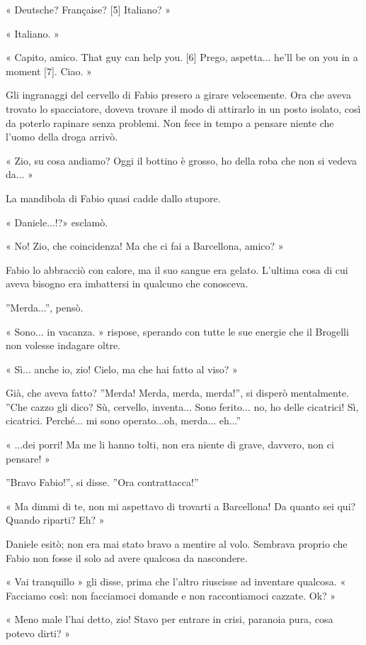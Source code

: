 « Deutsche? Française? [5] Italiano? »

« Italiano. »

« Capito, amico. That guy can help you. [6] Prego, aspetta... he'll be on you in a moment [7]. Ciao. »

Gli ingranaggi del cervello di Fabio presero a girare velocemente. Ora che aveva trovato lo spacciatore, doveva trovare il modo di attirarlo in un posto isolato, così da poterlo rapinare senza problemi. Non fece in tempo a pensare niente che l'uomo della droga arrivò.

« Zio, su cosa andiamo? Oggi il bottino è grosso, ho della roba che non si vedeva da... »

La mandibola di Fabio quasi cadde dallo stupore.

« Daniele...!?» esclamò.

« No! Zio, che coincidenza! Ma che ci fai a Barcellona, amico? »

Fabio lo abbracciò con calore, ma il suo sangue era gelato. L'ultima cosa di cui aveva bisogno era imbattersi in qualcuno che conosceva.

''Merda...'', pensò.

« Sono... in vacanza. » rispose, sperando con tutte le sue energie che il Brogelli non volesse indagare oltre.

« Sì... anche io, zio! Cielo, ma che hai fatto al viso? »

Già, che aveva fatto? ''Merda! Merda, merda, merda!'', si disperò mentalmente. ''Che cazzo gli dico? Sù, cervello, inventa... Sono ferito... no, ho delle cicatrici! Sì, cicatrici. Perché... mi sono operato...oh, merda... eh...''

« ...dei porri! Ma me li hanno tolti, non era niente di grave, davvero, non ci pensare! »

''Bravo Fabio!'', si disse. ''Ora contrattacca!''

« Ma dimmi di te, non mi aspettavo di trovarti a Barcellona! Da quanto sei qui? Quando riparti? Eh? »

Daniele esitò; non era mai stato bravo a mentire al volo. Sembrava proprio che Fabio non fosse il solo ad avere qualcosa da nascondere.

« Vai tranquillo » gli disse, prima che l'altro riuscisse ad inventare qualcosa. « Facciamo così: non facciamoci domande e non raccontiamoci cazzate. Ok? »

« Meno male l'hai detto, zio! Stavo per entrare in crisi, paranoia pura, cosa potevo dirti? »


